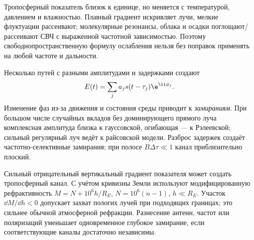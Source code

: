 
Тропосферный показатель близок к единице, но меняется с температурой, давлением и влажностью. Плавный градиент искривляет лучи, мелкие флуктуации рассеивают; молекулярные резонансы, облака и осадки поглощают/рассеивают СВЧ с выраженной частотной зависимостью. Поэтому свободнопространственную формулу ослабления нельзя без поправок применять на любой частоте и дальности.

Несколько путей с разными амплитудами и задержками создают
\begin{equation}
 E(t)=\sum_j a_js(t-\tau_j)\e^{\ii\phi_j}.
\end{equation}
Изменение фаз из-за движения и состояния среды приводит к \emph{замираниям}. При большом числе случайных вкладов без доминирующего прямого луча комплексная амплитуда близка к гауссовской, огибающая — к Рэлеевской; сильный регулярный луч ведёт к райсовской модели. Разброс задержек создаёт частотно-селективные замирания; при полосе $B\Delta\tau\ll1$ канал приблизительно плоский.

Сильный отрицательный вертикальный градиент показателя может создать тропосферный канал. С учётом кривизны Земли используют модифицированную рефрактивность $M=N+10^6h/R_E$, $N=10^6(n-1)$, $h\ll R_E$. Участок $\dd M/\dd h<0$ допускает захват пологих лучей при подходящих границах; это сильнее обычной атмосферной рефракции. Разнесение антенн, частот или поляризаций уменьшает одновременное глубокое замирание, если соответствующие каналы достаточно независимы.
